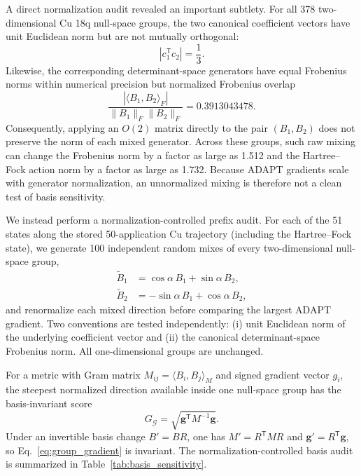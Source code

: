 \documentclass[
 aip,
 jcp,
 amsmath,amssymb,
 preprint
]{revtex4-2}
\begin{document}
A direct normalization audit revealed an important subtlety.
For all 378 two-dimensional Cu 18q null-space groups, the two canonical coefficient vectors have unit Euclidean norm but are not mutually orthogonal:
\begin{equation}
|c_1^\mathsf{T}c_2|=\frac13.
\end{equation}
Likewise, the corresponding determinant-space generators have equal Frobenius norms within numerical precision but normalized Frobenius overlap
\begin{equation}
\frac{|\langle B_1,B_2\rangle_F|}{\|B_1\|_F\|B_2\|_F}=0.3913043478.
\end{equation}
Consequently, applying an $O(2)$ matrix directly to the pair $(B_1,B_2)$ does not preserve the norm of each mixed generator.
Across these groups, such raw mixing can change the Frobenius norm by a factor as large as 1.512 and the Hartree--Fock action norm by a factor as large as 1.732.
Because ADAPT gradients scale with generator normalization, an unnormalized mixing is therefore not a clean test of basis sensitivity.

We instead perform a normalization-controlled prefix audit.
For each of the 51 states along the stored 50-application Cu trajectory (including the Hartree--Fock state), we generate 100 independent random mixes of every two-dimensional null-space group,
\begin{align}
\widetilde B_1&=\cos\alpha\,B_1+\sin\alpha\,B_2,\\
\widetilde B_2&=-\sin\alpha\,B_1+\cos\alpha\,B_2,
\end{align}
and renormalize each mixed direction before comparing the largest ADAPT gradient.
Two conventions are tested independently:
(i) unit Euclidean norm of the underlying coefficient vector and
(ii) the canonical determinant-space Frobenius norm.
All one-dimensional groups are unchanged.

For a metric with Gram matrix $M_{ij}=\langle B_i,B_j\rangle_M$ and signed gradient vector $g_i$, the steepest normalized direction available inside one null-space group has the basis-invariant score
\begin{equation}
G_{\mathcal G}=\sqrt{\boldsymbol g^\mathsf{T}M^{-1}\boldsymbol g}.
\label{eq:group_gradient}
\end{equation}
Under an invertible basis change $B'=BR$, one has $M'=R^\mathsf{T}MR$ and $\boldsymbol g'=R^\mathsf{T}\boldsymbol g$, so Eq.~\ref{eq:group_gradient} is invariant.
The normalization-controlled basis audit is summarized in Table~\ref{tab:basis_sensitivity}.
\end{document}
